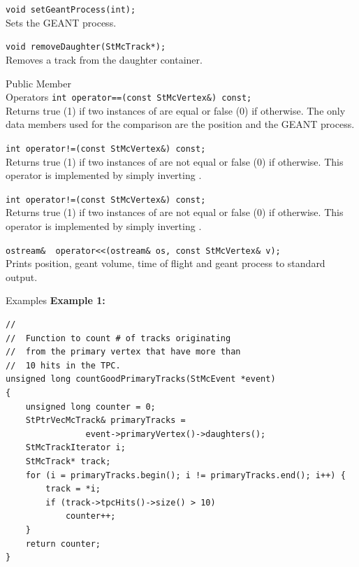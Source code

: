 \begin{Entry}
    \verb+void setGeantProcess(int); +\\
    Sets the GEANT process.

    \verb+void removeDaughter(StMcTrack*);+\\
    Removes a track from the daughter container.

\item[Public Member\\ Operators]
    \verb+int operator==(const StMcVertex&) const;+\\
    Returns true (1) if two instances of  are equal or false (0)
    if otherwise.
    The only data members used for the comparison are the position and the
    GEANT process.

    \verb+int operator!=(const StMcVertex&) const;+\\
    Returns true (1) if two instances of  are not equal or false (0)
    if otherwise.
    This operator is implemented by simply inverting .

    \verb+int operator!=(const StMcVertex&) const;+\\
    Returns true (1) if two instances of  are not equal or false (0)
    if otherwise.
    This operator is implemented by simply inverting .

    \verb+ostream&  operator<<(ostream& os, const StMcVertex& v);+\\
    Prints position, geant volume, time of flight and geant process to standard
    output.

\item[Examples] 
{\bf Example 1:}
{\footnotesize
\begin{verbatim}
//
//  Function to count # of tracks originating
//  from the primary vertex that have more than
//  10 hits in the TPC.
unsigned long countGoodPrimaryTracks(StMcEvent *event)
{
    unsigned long counter = 0;
    StPtrVecMcTrack& primaryTracks =
                event->primaryVertex()->daughters();
    StMcTrackIterator i;
    StMcTrack* track;
    for (i = primaryTracks.begin(); i != primaryTracks.end(); i++) {
        track = *i;
        if (track->tpcHits()->size() > 10)
            counter++;
    }
    return counter;
}
\end{verbatim}
}%

\end{Entry}
\clearpage
%
%

